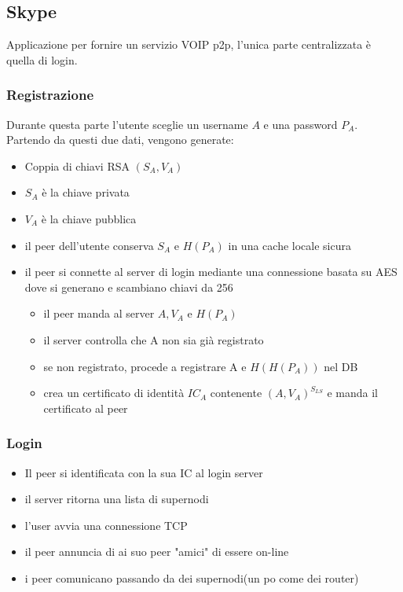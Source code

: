 \subsection{Skype}
Applicazione per fornire un servizio VOIP p2p, l'unica parte centralizzata è quella di login.
\subsubsection{Registrazione}
Durante questa parte l'utente sceglie un username $A$ e una password $P_A$.
Partendo da questi due dati, vengono generate:
\begin{itemize}
    \item Coppia di chiavi RSA $(S_A,V_A)$
    \item $S_A$ è la chiave privata
    \item $V_A$ è la chiave pubblica
    \item il peer dell'utente conserva $S_A$ e $H(P_A)$ in una cache locale sicura
    \item il peer si connette al server di login mediante una connessione basata su AES dove si generano e scambiano chiavi da 256 \begin{itemize}
    \item il peer manda al server $A, V_A $ e $ H(P_A)$
    \item il server controlla che A non sia già registrato
    \item se non registrato, procede a registrare A e $H(H(P_A))$ nel DB
    \item crea un certificato di identità $IC_A$ contenente $(A,V_A)^{S_{LS}}$ e manda il certificato al peer
    \end{itemize}
\end{itemize}

\subsubsection{Login}
\begin{itemize}
    \item Il peer si identificata con la sua IC al login server
    \item il server ritorna una lista di supernodi
    \item l'user avvia una connessione TCP
    \item il peer annuncia di ai suo peer "amici" di essere on-line
    \item i peer comunicano passando da dei supernodi(un po come dei router)
\end{itemize}
